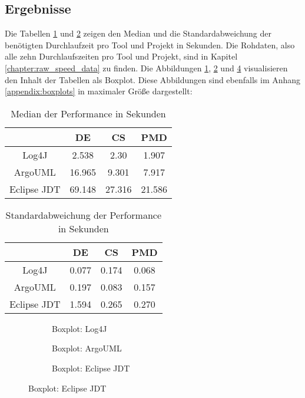  \subsection{Ergebnisse}\label{chapter:eval_speed_result}
 Die Tabellen \ref{tab:median_speed} und \ref{tab:std_speed} zeigen den Median und die Standardabweichung der benötigten Durchlaufzeit pro Tool und Projekt in Sekunden. Die Rohdaten, also alle zehn Durchlaufszeiten pro Tool und Projekt, sind in Kapitel \ref{chapter:raw_speed_data} zu finden. Die Abbildungen \ref{fig:log4j_box}, \ref{fig:argo_box} und \ref{fig:eclipse_box} visualisieren den Inhalt der Tabellen als Boxplot. Diese Abbildungen sind ebenfalls im Anhang \ref{appendix:boxplots} in maximaler Größe dargestellt: 
 \begin{table}[ht!]
     \centering
     \begin{tabular}{c|c|c|c}
        & DE & CS & PMD  \\\hline
        Log4J & 2.538 & 2.30 & 1.907\\\hline 
        ArgoUML & 16.965 & 9.301 & 7.917 \\\hline
        Eclipse \ac{JDT} & 69.148 & 27.316 & 21.586
     \end{tabular}
     \caption{Median der Performance in Sekunden}
     \label{tab:median_speed}
 \end{table}
 
  \begin{table}[ht!]
     \centering
     \begin{tabular}{c|c|c|c}
        & DE & CS & PMD  \\\hline
        Log4J & 0.077 &  0.174 &  0.068\\\hline 
        ArgoUML & 0.197 &  0.083 & 0.157 \\\hline
        Eclipse \ac{JDT} & 1.594 & 0.265 & 0.270\\\hline
     \end{tabular}
     \caption{Standardabweichung der Performance in Sekunden}
     \label{tab:std_speed}
 \end{table}
 
 \begin{figure}
    \begin{subfigure}[b]{0.6\textwidth}
    \centering

    \caption{Boxplot: Log4J}
    \label{fig:log4j_box}
\end{subfigure}
\hfill
 \begin{subfigure}[b]{0.6\textwidth}
    \centering

    \caption{Boxplot: ArgoUML}
    \label{fig:argo_box}
\end{subfigure}

 \begin{subfigure}[b]{0.8\textwidth}
    \centering

    \caption{Boxplot: Eclipse \ac{JDT} }
    \label{fig:eclipse_box}
\end{subfigure}
   
 \end{figure}
 

